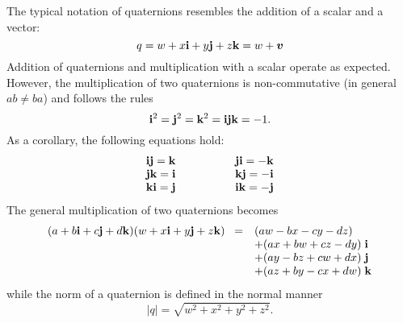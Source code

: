 The typical notation of quaternions resembles the addition of a scalar
and a vector:
%
\begin{equation}
q = w + x\mathbf{i} + y\mathbf{j} + z\mathbf{k} = w + \boldsymbol{v}
\end{equation}
%
Addition of quaternions and multiplication with a scalar operate as
expected.  However, the multiplication of two quaternions is
non-commutative (in general $ab \neq ba$) and follows the rules
%
\begin{equation}
\mathbf{i}^2 = \mathbf{j}^2 = \mathbf{k}^2 = \mathbf{i}\mathbf{j}\mathbf{k} = -1.
\end{equation}
%
As a corollary, the following equations hold:
%
\begin{equation}
\begin{array}{rl}
\vi\vj = \vk  \hspace{15mm}& \vj\vi = -\vk \\
\vj\vk = \vi  \hspace{15mm}& \vk\vj = -\vi \\
\vk\vi = \vj  \hspace{15mm}& \vi\vk = -\vj 
\end{array}
\end{equation}
%
The general multiplication of two quaternions becomes
%
\begin{equation}
\begin{array}{rl}
(a + b\mathbf{i} + c\mathbf{j} + d\mathbf{k})(w + x\mathbf{i} + y\mathbf{j} + z\mathbf{k})\;\; =
 &   (aw-bx-cy-dz) \\
 & + (ax+bw+cz-dy)\;\mathbf{i} \\
 & + (ay-bz+cw+dx)\;\mathbf{j} \\
 & + (az+by-cx+dw)\;\mathbf{k}
\end{array}
\end{equation}
%
while the norm of a quaternion is defined in the normal manner
%
\begin{equation}
|q| = \sqrt{w^2+x^2+y^2+z^2}.
\end{equation}

